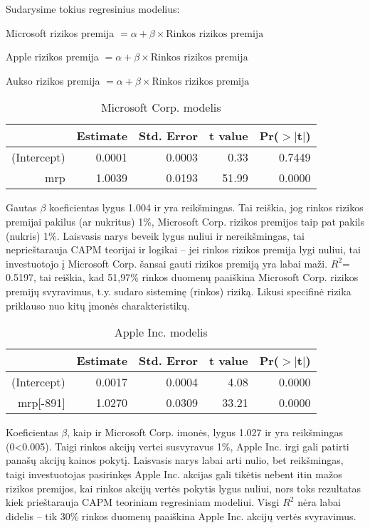 \documentclass[12pt, a14paper, lithuanian]{article}
\begin{document}
Sudarysime tokius regresinius modelius:

Microsoft rizikos premija $= \alpha + \beta \times  \text {Rinkos rizikos premija}$

Apple rizikos premija $= \alpha + \beta \times  \text {Rinkos rizikos premija}$

Aukso rizikos premija $= \alpha + \beta \times \text {Rinkos rizikos premija}$



\begin{table}[ht]
\begin{center}
\begin{tabular}{rrrrr}
  \hline
 & Estimate & Std. Error & t value & Pr($>$$|$t$|$) \\ 
  \hline
(Intercept) & 0.0001 & 0.0003 & 0.33 & 0.7449 \\ 
  mrp & 1.0039 & 0.0193 & 51.99 & 0.0000 \\ 
   \hline
\end{tabular}
\end{center}
\caption{Microsoft Corp. modelis}
\end{table}

Gautas $\beta$ koeficientas lygus 1.004 ir yra reikšmingas. Tai reiškia, jog rinkos rizikos premijai pakilus (ar nukritus) 1\%, Microsoft Corp. rizikos premijos taip pat pakils (nukris) 1\%. Laisvasis narys beveik lygus nuliui ir nereikšmingas,
tai neprieštarauja CAPM teorijai ir logikai -- jei rinkos rizikos premija lygi nuliui, tai investuotojo į Microsoft Corp. šansai gauti rizikos premiją yra labai maži.
$R^2$= 0.5197, tai reiškia, kad 51,97\% rinkos duomenų paaiškina Microsoft Corp. rizikos premijų svyravimus, t.y. sudaro sisteminę (rinkos) riziką. Likusi specifinė rizika priklauso nuo kitų įmonės charakteristikų.

\begin{table}[ht]
\begin{center}
\begin{tabular}{rrrrr}
  \hline
 & Estimate & Std. Error & t value & Pr($>$$|$t$|$) \\ 
  \hline
(Intercept) & 0.0017 & 0.0004 & 4.08 & 0.0000 \\ 
  mrp[-891] & 1.0270 & 0.0309 & 33.21 & 0.0000 \\ 
   \hline
\end{tabular}
\end{center}
\caption{Apple Inc. modelis}
\end{table}

Koeficientas $\beta$, kaip ir Microsoft Corp. imonės, lygus 1.027 ir yra reikšmingas (0<0.005). Taigi rinkos akcijų vertei susvyravus 1\%, Apple
Inc. irgi gali patirti panašų akcijų kainos pokytį. Laisvasis narys labai arti nulio, bet reikšmingas,
taigi investuotojas pasirinkęs Apple Inc. akcijas gali tikėtis nebent itin mažos rizikos premijos, kai rinkos akcijų vertės
pokytis lygus nuliui, nors toks rezultatas kiek prieštarauja CAPM teoriniam regresiniam modeliui.
Visgi  $R^2$ nėra labai didelis -- tik 30\% rinkos duomenų paaiškina Apple Inc. akcijų vertės svyravimus.
\end{document}
